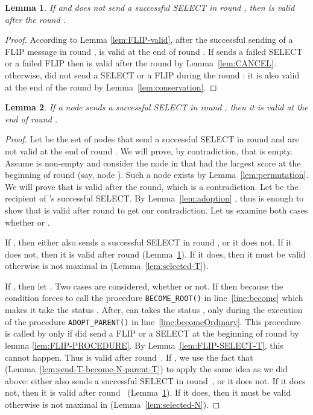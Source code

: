 \documentclass[twocolumn]{article}
\newtheorem{lemma}{Lemma}
\newcommand{\depends}[1]{}
\begin{document}
\begin{lemma}
  \label{lem:all-but-SELECT-valid}
  If  and  does not send a successful SELECT in round , then  is valid after the round .
\end{lemma}

\begin{proof}
According to Lemma \ref{lem:FLIP-valid}, after the successful sending of a FLIP message in round ,  is valid at the end of round . 
If  sends a failed SELECT or a failed FLIP then  is valid after the round  by Lemma~\ref{lem:CANCEL}.
otherwise,  did not send a SELECT or a FLIP during the round :
it is also valid at the end of the round by Lemma~\ref{lem:conservation}.
 \end{proof}

\begin{lemma}
\label{lem:select_valid}
If a node sends a successful SELECT in round ,
then it is valid at the end of round . 
\depends{\ref{lem:permutation}, \ref{lem:regeneration}, \ref{lem:adoption}, \ref{lem:send-T-become-N-parent-T}, \ref{lem:selected-T}, \ref{lem:selected-N}, \ref{lem:all-but-SELECT-valid}}
\end{lemma}

\begin{proof}
Let  be the set of nodes that send a successful  
SELECT in round  and are not valid at the end of round . We will prove, by contradiction, that  is empty. Assume  is non-empty and consider the node in  that had the largest score at the beginning of round (say, node ). Such a node exists by Lemma~\ref{lem:permutation}. We will prove that  is valid after the round, which is a contradiction. Let  be the recipient of 's successful SELECT. By Lemma~\ref{lem:adoption} , thus is enough to show that  is valid after round  to get our contradiction. Let us examine both cases whether  or .

If , then either  also sends a successful SELECT in round , or it does not. If it does not, then it is valid after round  (Lemma~\ref{lem:all-but-SELECT-valid}). 
If it does, then it must be valid otherwise  is not maximal in  (Lemma~\ref{lem:selected-T}).

If , then let . Two cases are considered, whether  or not. If  then  because the condition forces  to call the procedure \texttt{BECOME\_ROOT()} in line~\ref{line:become} which makes it take the status . After,  can takes the status , only during the execution of the procedure \texttt{ADOPT\_PARENT()}
in line~\ref{line:becomeOrdinary}. 
This procedure is called by  only 
if  did send a FLIP or a SELECT 
at the beginning of round  by lemma  \ref{lem:FLIP-PROCEDURE}. 
By Lemma~\ref{lem:FLIP-SELECT-T}, 
this cannot happen.
Thus  is valid after round~. If , we use the fact that  (Lemma~\ref{lem:send-T-become-N-parent-T}) to apply the same idea as we did above: either  also sends a successful SELECT in round~, or it does not. If it does not, then it is valid after round~ (Lemma~\ref{lem:all-but-SELECT-valid}). If it does, then it must be valid otherwise  is not maximal in  (Lemma~\ref{lem:selected-N}).
 \end{proof}
\end{document}
